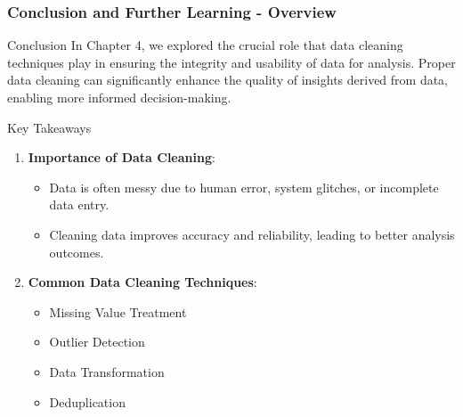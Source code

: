 \documentclass[aspectratio=169]{beamer}
\begin{document}
\begin{frame}[fragile]
    \frametitle{Conclusion and Further Learning - Overview}
    \begin{block}{Conclusion}
        In Chapter 4, we explored the crucial role that data cleaning techniques play in ensuring the integrity and usability of data for analysis. Proper data cleaning can significantly enhance the quality of insights derived from data, enabling more informed decision-making.
    \end{block}

    \begin{block}{Key Takeaways}
        \begin{enumerate}
            \item \textbf{Importance of Data Cleaning}:
            \begin{itemize}
                \item Data is often messy due to human error, system glitches, or incomplete data entry.
                \item Cleaning data improves accuracy and reliability, leading to better analysis outcomes.
            \end{itemize}
    
            \item \textbf{Common Data Cleaning Techniques}:
            \begin{itemize}
                \item Missing Value Treatment
                \item Outlier Detection
                \item Data Transformation
                \item Deduplication
            \end{itemize}
        \end{enumerate}
    \end{block}
\end{frame}
\end{document}
